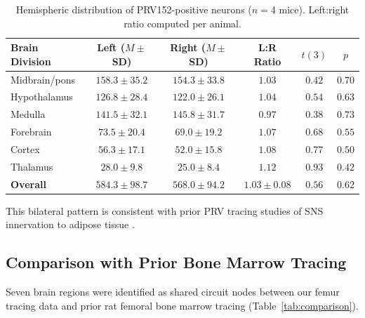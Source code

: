 \documentclass[11pt]{article}
\begin{document}
\begin{table}[H]
\centering
\caption{Hemispheric distribution of PRV152-positive neurons ($n = 4$ mice). Left:right ratio computed per animal.}
\label{tab:laterality}
\begin{tabular}{lccccc}
\toprule
Brain Division & Left ($M \pm$ SD) & Right ($M \pm$ SD) & L:R Ratio & $t(3)$ & $p$ \\
\midrule
Midbrain/pons & $158.3 \pm 35.2$ & $154.3 \pm 33.8$ & $1.03$ & $0.42$ & $0.70$ \\
Hypothalamus & $126.8 \pm 28.4$ & $122.0 \pm 26.1$ & $1.04$ & $0.54$ & $0.63$ \\
Medulla & $141.5 \pm 32.1$ & $145.8 \pm 31.7$ & $0.97$ & $0.38$ & $0.73$ \\
Forebrain & $73.5 \pm 20.4$ & $69.0 \pm 19.2$ & $1.07$ & $0.68$ & $0.55$ \\
Cortex & $56.3 \pm 17.1$ & $52.0 \pm 15.8$ & $1.08$ & $0.77$ & $0.50$ \\
Thalamus & $28.0 \pm 9.8$ & $25.0 \pm 8.4$ & $1.12$ & $0.93$ & $0.42$ \\
\midrule
\textbf{Overall} & $584.3 \pm 98.7$ & $568.0 \pm 94.2$ & $\mathbf{1.03 \pm 0.08}$ & $0.56$ & $\mathbf{0.62}$ \\
\bottomrule
\end{tabular}
\end{table}

This bilateral pattern is consistent with prior PRV tracing studies of SNS innervation to adipose tissue \citep{bartness2014sns, song2005tracing}.

\subsection{Comparison with Prior Bone Marrow Tracing}

Seven brain regions were identified as shared circuit nodes between our femur tracing data and prior rat femoral bone marrow tracing (Table~\ref{tab:comparison}).
\end{document}
